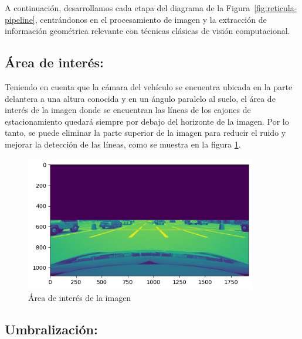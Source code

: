 A continuación, desarrollamos cada etapa del diagrama de la Figura~\ref{fig:reticula-pipeline},
centrándonos en el procesamiento de imagen y la extracción de información geométrica relevante con técnicas clásicas de visión computacional.


\subsection{Área de interés:}

Teniendo en cuenta que la cámara del vehículo se encuentra ubicada en la parte delantera a una altura conocida y en un ángulo paralelo al suelo, el área de interés de la imagen donde se encuentran las líneas de los cajones de estacionamiento quedará siempre por debajo del horizonte de la imagen.
Por lo tanto, se puede eliminar la parte superior de la imagen para
reducir el ruido y mejorar la detección de las líneas, como se muestra en la figura \ref{fig:roi}. \\
\begin{figure}[!ht]
    \centering
    \includegraphics[width=0.9\textwidth]{img/reticule/horizont}
    \caption{Área de interés de la imagen}
    \label{fig:roi}
\end{figure}

\subsection{Umbralización:}

